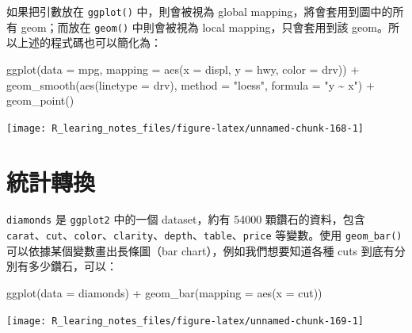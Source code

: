 \documentclass[
]{book}
\newenvironment{Shaded}{\begin{snugshade}}{\end{snugshade}}
\newcommand{\AttributeTok}[1]{\textcolor[rgb]{0.77,0.63,0.00}{#1}}
\newcommand{\FunctionTok}[1]{\textcolor[rgb]{0.00,0.00,0.00}{#1}}
\newcommand{\NormalTok}[1]{#1}
\newcommand{\SpecialCharTok}[1]{\textcolor[rgb]{0.00,0.00,0.00}{#1}}
\newcommand{\StringTok}[1]{\textcolor[rgb]{0.31,0.60,0.02}{#1}}
\theoremstyle{definition}
\theoremstyle{remark}
\begin{document}
如果把引數放在 \texttt{ggplot()} 中，則會被視為 global mapping，將會套用到圖中的所有 geom；而放在 \texttt{geom()} 中則會被視為 local mapping，只會套用到該 geom。所以上述的程式碼也可以簡化為：

\begin{Shaded}
\begin{Highlighting}[]
\FunctionTok{ggplot}\NormalTok{(}\AttributeTok{data =}\NormalTok{ mpg, }\AttributeTok{mapping =} \FunctionTok{aes}\NormalTok{(}\AttributeTok{x =}\NormalTok{ displ, }\AttributeTok{y =}\NormalTok{ hwy, }\AttributeTok{color =}\NormalTok{ drv)) }\SpecialCharTok{+} 
  \FunctionTok{geom\_smooth}\NormalTok{(}\FunctionTok{aes}\NormalTok{(}\AttributeTok{linetype =}\NormalTok{ drv), }\AttributeTok{method =} \StringTok{"loess"}\NormalTok{, }\AttributeTok{formula =} \StringTok{"y \textasciitilde{} x"}\NormalTok{) }\SpecialCharTok{+} 
  \FunctionTok{geom\_point}\NormalTok{()}
\end{Highlighting}
\end{Shaded}

\begin{center}\texttt{[image: R\_learing\_notes\_files/figure-latex/unnamed-chunk-168-1]} \end{center}

\hypertarget{ux7d71ux8a08ux8f49ux63db}{%
\section{統計轉換}\label{ux7d71ux8a08ux8f49ux63db}}

\texttt{diamonds} 是 \texttt{ggplot2} 中的一個 dataset，約有 54000 顆鑽石的資料，包含 \texttt{carat}、\texttt{cut}、\texttt{color}、\texttt{clarity}、\texttt{depth}、\texttt{table}、\texttt{price} 等變數。使用 \texttt{geom\_bar()} 可以依據某個變數畫出長條圖（bar chart），例如我們想要知道各種 cuts 到底有分別有多少鑽石，可以：

\begin{Shaded}
\begin{Highlighting}[]
\FunctionTok{ggplot}\NormalTok{(}\AttributeTok{data =}\NormalTok{ diamonds) }\SpecialCharTok{+} \FunctionTok{geom\_bar}\NormalTok{(}\AttributeTok{mapping =} \FunctionTok{aes}\NormalTok{(}\AttributeTok{x =}\NormalTok{ cut))}
\end{Highlighting}
\end{Shaded}

\begin{center}\texttt{[image: R\_learing\_notes\_files/figure-latex/unnamed-chunk-169-1]} \end{center}
\end{document}

